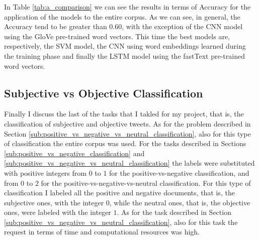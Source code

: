 \documentclass[11pt,twocolumn]{article}
\begin{document}
            \noindent
            In Table \ref{tab:a_comparison} we can see the results in terms of Accuracy for the application
            of the models to the entire corpus. As we can see, in general, the Accuracy tend to be greater
            than $0.60$, with the exception of the CNN model using the GloVe pre-trained word vectors. This
            time the best models are, respectively, the SVM model, the CNN using word embeddings learned
            during the training phase and finally the LSTM model using the fastText pre-trained word
            vectors.

        \subsection{Subjective vs Objective Classification} %
        \label{sub:subjective_vs_objective_classification}
            Finally I discuss the last of the tasks that I takled for my project, that is, the
            classification of subjective and objective tweets. As for the problem described in Section
            \ref{sub:positive_vs_negative_vs_neutral_classification}, also for this type of
            classification the entire corpus was used. For the tasks described in Sections
            \ref{sub:positive_vs_negative_classification} and
            \ref{sub:positive_vs_negative_vs_neutral_classification} the labels were substituted with
            positive integers from $0$ to $1$ for the positive-vs-negative classification, and from $0$ to
            $2$ for the positive-vs-negative-vs-neutral classification. For this type of classification I
            labeled all the positive and negative documents, that is, the subjective ones, with the integer
            $0$, while the neutral ones, that is, the objective ones, were labeled with the integer $1$.
            As for the task described in Section \ref{sub:positive_vs_negative_vs_neutral_classification},
            also for this task the request in terms of time and computational resources was high.
\end{document}
